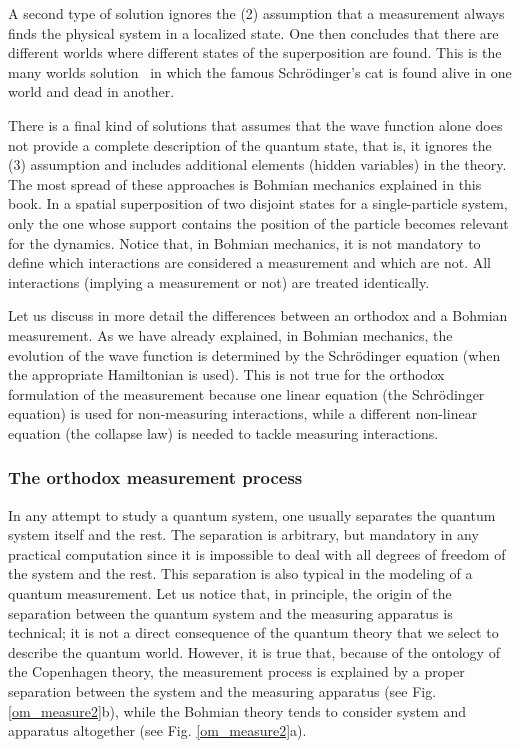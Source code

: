 \documentclass[nofootinbib, secnumarabic, amsmath, nobibnotes,11pt,aps,pra, floatfix]{revtex4-1}
\newcommand{\fref}[1]{Fig. \ref{#1}}
\begin{document}
A second type of solution ignores the (2) assumption that a measurement always finds the physical system in a localized state.
One then concludes that there are different worlds where different states of the superposition are found.
This is the many worlds solution~\cite{om.Everett57,om.wallace12} in which the famous Schr\"odinger's cat
is found alive in one world and dead in another.

There is a final kind of solutions that assumes that the wave function alone does not provide a complete description of the quantum state, that is, it ignores the (3) assumption and includes additional elements (hidden variables) in the theory. The most spread of these approaches is Bohmian mechanics explained in this book.  In a spatial superposition of two disjoint states for a single-particle system, only the one whose support contains the position of the particle becomes  relevant for the dynamics. Notice that, in Bohmian mechanics, it is not mandatory to define which interactions are considered a measurement and which are not. All interactions (implying a measurement or not) are treated identically. 

Let us discuss in more detail the differences between an orthodox and a Bohmian measurement. As we have already explained, in Bohmian mechanics, the evolution of the wave function is determined by the Schr\"odinger equation (when the appropriate Hamiltonian is used). This is not true for the orthodox formulation of the measurement because one linear equation (the Schr\"odinger equation) is used for non-measuring interactions, while a different non-linear equation (the collapse law) is needed to tackle measuring interactions. 

\subsubsection{The orthodox measurement process}\label{meaort}

In any attempt to study a quantum system, one usually separates the quantum system itself and the rest. The separation is arbitrary, but mandatory in any practical computation since it is impossible to deal with all degrees of freedom of the system and the rest. This separation is also typical in the modeling of a quantum measurement. Let us notice that, in principle, the origin of the separation between the quantum system and the measuring apparatus is technical; it is not a direct consequence of the quantum theory that we select to describe the quantum world. However, it is true that, because of the ontology of the Copenhagen theory, the measurement process is explained by a proper separation between the system and the measuring apparatus (see \fref{om_measure2}b), while the Bohmian theory tends to consider system and apparatus altogether (see \fref{om_measure2}a). 
\end{document}
